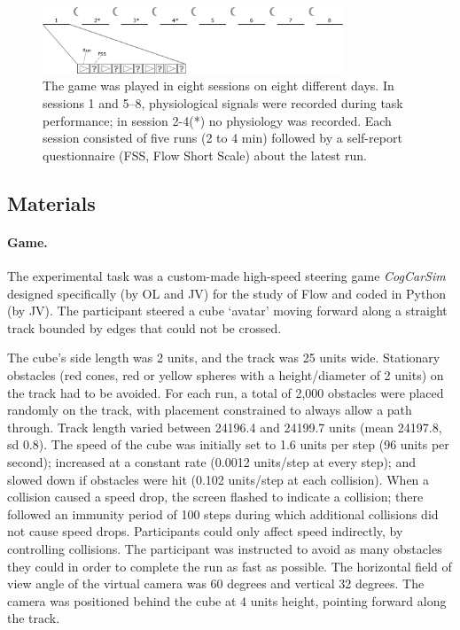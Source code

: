 \documentclass[fleqn,10pt]{wlscirep}
\newcommand{\nicewidth}{0.8\textwidth}
\begin{document}
\begin{figure}[!ht]
\centering
\includegraphics[width=\nicewidth]{design1}
\caption{The game was played in eight sessions on eight different days. In sessions 1 and 5--8, physiological signals were recorded during task performance; in session 2-4(*) no physiology was recorded. Each session consisted of five runs (2 to 4 min) followed by a self-report questionnaire (FSS, Flow Short Scale) about the latest run.}
\label{fig:design}
\end{figure}

\subsection*{Materials}
\paragraph{Game.} The experimental task was a custom-made high-speed steering game {\it CogCarSim} designed specifically (by OL and JV) for the study of Flow and coded in Python (by JV). The participant steered a cube `avatar' moving forward along a straight track bounded by edges that could not be crossed.

The cube's side length was 2 units, and the track was 25 units wide. Stationary obstacles (red cones, red or yellow spheres with a height/diameter of 2 units) on the track had to be avoided. For each run, a total of 2,000 obstacles were placed randomly on the track, with placement constrained to always allow a path through. Track length varied between 24196.4 and 24199.7 units (mean 24197.8, sd 0.8). The speed of the cube was initially set to 1.6 units per step (96 units per second); increased at a constant rate (0.0012 units/step at every step); and slowed down if obstacles were hit (0.102 units/step at each collision). When a collision caused a speed drop, the screen flashed to indicate a collision; there followed an immunity period of 100 steps during which additional collisions did not cause speed drops. Participants could only affect speed indirectly, by controlling collisions. The participant was instructed to avoid as many obstacles they could in order to complete the run as fast as possible. The horizontal field of view angle of the virtual camera was 60 degrees and vertical 32 degrees. The camera was positioned behind the cube at 4 units height, pointing forward along the track.
\end{document}
